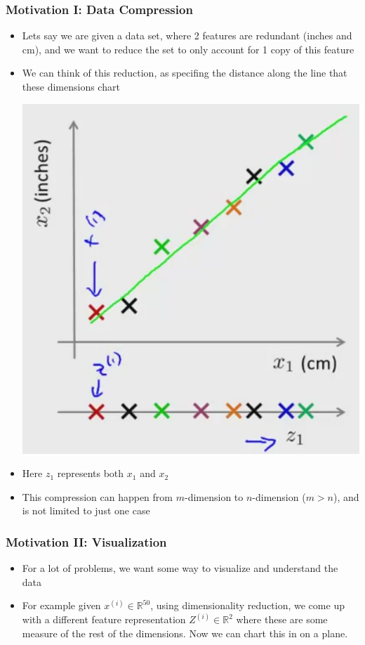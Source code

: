 \subsubsection{Motivation I: Data Compression}
\begin{itemize}[--]
	\item Lets say we are given a data set, where 2 features are redundant (inches and cm), and we want to reduce the set to only account for 1 copy of this feature
	\item We can think of this reduction, as specifing the distance along the line that these dimensions chart

	\begin{center}
		\includegraphics[scale=0.5]{sections/cs229/w11/2d_1d.png}
	\end{center}

	\item Here $z_1$ represents both $x_1$ and $x_2$
	\item This compression can happen from $m$-dimension to $n$-dimension ($m> n$), and is not limited to just one case
\end{itemize}

\subsubsection{Motivation II: Visualization}
\begin{itemize}[--]
	\item For a lot of problems, we want some way to visualize and understand the data 
	\item For example given $x^{(i)}\in\mathbb{R}^{50}$, using dimensionality reduction, we come up with a different feature representation $Z^{(i)}\in\mathbb{R}^2$ where these are some measure of the rest of the dimensions. Now we can chart this in on a plane.
\end{itemize}

